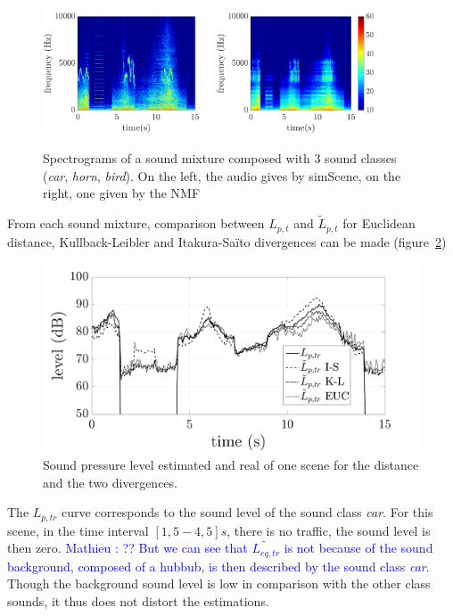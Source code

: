 \documentclass{article}
\newcommand{\ml}[1]{\textcolor{blue}{ Mathieu : #1}}
\begin{document}
\begin{sloppy}
\begin{figure}[t]
\centering
\includegraphics[width=5cm]{images/bvak_Sc2_Vscene_spectre_Euc.pdf}
\includegraphics[width=5cm]{images/bvak_Sc2_Vapprox_spectre_Euc.pdf}
\caption{Spectrograms of a sound mixture composed with 3 sound classes (\textit{car}, \textit{horn}, \textit{bird}). On the left, the audio gives by simScene, on the right, one given by the NMF}
\label{fig:spectrogram}
\end{figure}


From each sound mixture, comparison between $L_{p,t}$ and $\tilde{L}_{p,t}$ for Euclidean distance, Kullback-Leibler and Itakura-Saïto divergences can be made (figure~\ref{fig:Lp})\\

\begin{figure}[t]
\centering
\centerline{\includegraphics[scale=0.30]{images/Lp_bvak_Sc2_It100_nbCl3.pdf}}
\caption{Sound pressure level estimated and real of one scene for the distance and the two divergences.}
\label{fig:Lp}
\end{figure}

The $L_{p,tr}$ curve corresponds to the sound level of the sound class \textit{car}. For this scene, in the time interval $\left[ 1,5 - 4,5\right] s$, there is no traffic, the sound level is then zero. \ml{?? But we can see that $\tilde{L_{eq,tr}}$ is not because of the sound background, composed of a hubbub, is then described by the sound class \textit{car}}. Though the background sound level is low in comparison with the other class sounds, it thus does not distort the estimations.


\end{sloppy}
\end{document}
